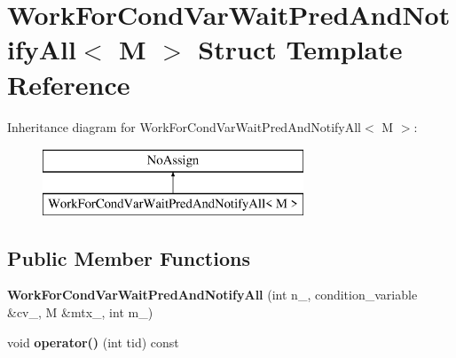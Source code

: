 \hypertarget{structWorkForCondVarWaitPredAndNotifyAll}{}\section{Work\+For\+Cond\+Var\+Wait\+Pred\+And\+Notify\+All$<$ M $>$ Struct Template Reference}
\label{structWorkForCondVarWaitPredAndNotifyAll}
Inheritance diagram for Work\+For\+Cond\+Var\+Wait\+Pred\+And\+Notify\+All$<$ M $>$\+:\begin{figure}[H]
\begin{center}
\leavevmode
\includegraphics[height=2.000000cm]{structWorkForCondVarWaitPredAndNotifyAll}
\end{center}
\end{figure}
\subsection*{Public Member Functions}
\begin{DoxyCompactItemize}
\item 
\hypertarget{structWorkForCondVarWaitPredAndNotifyAll_aadd3b7fa9f9c8c6e0ba275ff6fd3358f}{}{\bfseries Work\+For\+Cond\+Var\+Wait\+Pred\+And\+Notify\+All} (int n\+\_\+, condition\+\_\+variable \&cv\+\_\+, M \&mtx\+\_\+, int m\+\_\+)\label{structWorkForCondVarWaitPredAndNotifyAll_aadd3b7fa9f9c8c6e0ba275ff6fd3358f}

\item 
\hypertarget{structWorkForCondVarWaitPredAndNotifyAll_a26c22e8f7d6b78f05387b5f726aa482f}{}void {\bfseries operator()} (int tid) const \label{structWorkForCondVarWaitPredAndNotifyAll_a26c22e8f7d6b78f05387b5f726aa482f}

\end{DoxyCompactItemize}
